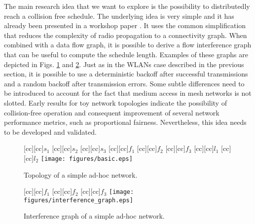 \documentclass[a4paper,twocolumns]{article}%
\begin{document}
The main research idea that we want to explore is the possibility to distributedly reach a collision free schedule.
The underlying idea is very simple and it has already been presented in a workshop paper \cite{barcelo2011cfo}.
It uses the common simplification that reduces the complexity of radio propagation to a connectivity graph.
When combined with a data flow graph, it is possible to derive a flow interference graph that can be useful to compute the schedule length.
Examples of these graphs are depicted in Figs. \ref{fig:basic} and \ref{fig:interference_graph}.
Just as in the WLANs case described in the previous section, it is possible to use a deterministic backoff after successful transmissions and a random backoff after transmission errors.
Some subtle differences need to be introduced to account for the fact that medium access in mesh networks is not slotted.
Early results for toy network topologies indicate the possibility of collision-free operation and consequent improvement of several network performance metrics, such as proportional fairness.
Nevertheless, this idea needs to be developed and validated.

\begin{figure}[b]
[cc][cc]{$s_1$}
[cc][cc]{$s_2$}
[cc][cc]{$s_3$}
[cc][cc]{$f_1$}
[cc][cc]{$f_2$}
[cc][cc]{$f_3$}
[cc][cc]{$l_1$}
[cc][cc]{$l_2$}
\centering
\texttt{[image: figures/basic.eps]}
\caption{Topology of a simple ad-hoc network.}
\label{fig:basic}
\end{figure}

\begin{figure}[b]
[cc][cc]{$f_1$}
[cc][cc]{$f_2$}
[cc][cc]{$f_3$}
\centering
\texttt{[image: figures/interference\_graph.eps]}
\caption{Interference graph of a simple ad-hoc network.}
\label{fig:interference_graph}
\end{figure}
\end{document}
